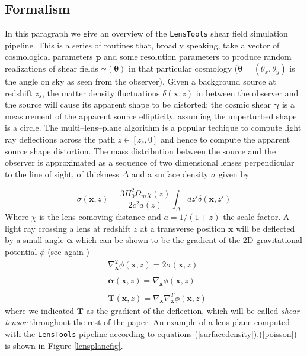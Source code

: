 \documentclass[reprint,aps,prd,superscriptaddress,showkeys,showpacs]{revtex4-1}
\newcommand{\bb}[1]{\mathbf{#1}}
\newcommand{\LT}{\texttt{LensTools} }
\begin{document}
\subsection{Formalism}
%
In this paragraph we give an overview of the \LT shear field simulation pipeline. This is a series of routines that, broadly speaking, take a vector of cosmological parameters $\bb{p}$ and some resolution parameters to produce random realizations of shear fields $\pmb{\gamma}(\pmb{\theta})$ in that particular cosmology ($\pmb{\theta}=(\theta_x,\theta_y)$ is the angle on sky as seen from the observer). Given a background source at redshift $z_s$, the matter density fluctuations $\delta(\bb{x},z)$ in between the observer and the source will cause its apparent shape to be distorted; the cosmic shear $\pmb{\gamma}$ is a measurement of the apparent source ellipticity, assuming the unperturbed shape is a circle. The multi--lens--plane algorithm \citep{RayTracingHartlap} is a popular techique to compute light ray deflections across the path $z\in[z_s,0]$ and hence to compute the apparent source shape distortion. The mass distribution between the source and the observer is approximated as a sequence of two dimensional lenses perpendicular to the line of sight, of thickness $\Delta$ and a surface density $\sigma$ given by 

\begin{equation}
\label{surfacedensity}
\sigma(\bb{x},z) = \frac{3H_0^2\Omega_m\chi(z)}{2c^2a(z)}\int_\Delta dz'\delta(\bb{x},z')
\end{equation}
%
Where $\chi$ is the lens comoving distance and $a=1/(1+z)$ the scale factor. A light ray crossing a lens at redshift $z$ at a transverse position $\bb{x}$ will be deflected by a small angle $\pmb{\alpha}$ which can be shown to be the gradient of the 2D gravitational potential $\phi$ (see again \citep{RayTracingHartlap}) 
%
\begin{equation}
\label{poisson}
\begin{matrix}
& \nabla^2_\bb{x} \phi(\bb{x},z) = 2\sigma(\bb{x},z) \\ \\
& \pmb{\alpha}(\bb{x},z) = \nabla_\bb{x} \phi(\bb{x},z) \\ \\
& \bb{T}(\bb{x},z) = \nabla_\bb{x}\nabla_\bb{x}^T \phi(\bb{x},z)
\end{matrix}
\end{equation}
%
where we indicated $\bb{T}$ as the gradient of the deflection, which will be called \textit{shear tensor} throughout the rest of the paper. An example of a lens plane computed with the \LT pipeline according to equations (\ref{surfacedensity}),(\ref{poisson}) is shown in Figure \ref{lensplanefig}. 
\end{document}
